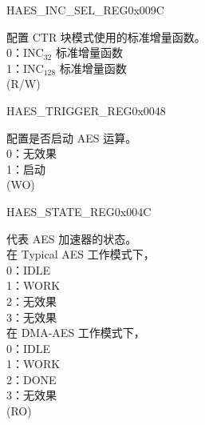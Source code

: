 \begin{register}{H}{AES\_INC\_SEL\_REG}{0x009C}\label{regdesc:AESINCSELREG}
%
%
\regnewline%
\begin{regdesc}\begin{reglist}
\item [AES\_INC\_SEL] 配置 CTR 块模式使用的标准增量函数。\\
0：INC$_{32}$ 标准增量函数\\
1：INC$_{128}$ 标准增量函数\\
(R/W)
\end{reglist}\end{regdesc}
\end{register}

\begin{register}{H}{AES\_TRIGGER\_REG}{0x0048}\label{regdesc:AESTRIGGERREG}
%
%
\regnewline%
\begin{regdesc}\begin{reglist}
\item [AES\_TRIGGER] 配置是否启动 AES 运算。\\
0：无效果\\
1：启动\\
(WO)
\end{reglist}\end{regdesc}
\end{register}


\begin{register}{H}{AES\_STATE\_REG}{0x004C}\label{regdesc:AESSTATEREG}
%
%
\regnewline%
\begin{regdesc}\begin{reglist}
\item [AES\_STATE] 代表 AES 加速器的状态。\\
在 Typical AES 工作模式下，\\
0：IDLE \\
1：WORK\\
2：无效果\\
3：无效果\\
在 DMA-AES 工作模式下，\\
0：IDLE\\
1：WORK\\
2：DONE\\
3：无效果\\
(RO) 
\end{reglist}\end{regdesc}
\end{register}

